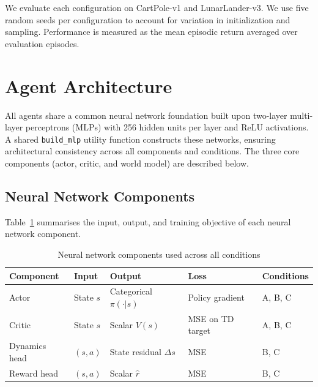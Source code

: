 We evaluate each configuration on CartPole-v1 and LunarLander-v3. We use five random seeds per configuration to account for variation in initialization and sampling. Performance is measured as the mean episodic return averaged over evaluation episodes.

\section{Agent Architecture}
\label{sec:method_arch}

All agents share a common neural network foundation built upon two-layer
multi-layer perceptrons (MLPs) with 256 hidden units per layer and ReLU
activations. A shared \texttt{build\_mlp} utility function constructs these
networks, ensuring architectural consistency across all components and conditions.
The three core components (actor, critic, and world model) are described below.

\subsection{Neural Network Components}
\label{subsec:method_nn}

Table~\ref{tab:nn_components} summarises the input, output, and training objective
of each neural network component.

\begin{table}[!ht]
    \centering
    \caption{Neural network components used across all conditions}
    \label{tab:nn_components}
    \begin{tabular}{lllll}
        \toprule
        \textbf{Component} & \textbf{Input} & \textbf{Output} & \textbf{Loss} & \textbf{Conditions} \\
        \midrule
        Actor   & State $s$ & Categorical $\pi(\cdot|s)$ & Policy gradient & A, B, C \\
        Critic  & State $s$ & Scalar $V(s)$              & MSE on TD target & A, B, C \\
        Dynamics head & $(s, a)$ & State residual $\Delta s$ & MSE & B, C \\
        Reward head   & $(s, a)$ & Scalar $\hat{r}$        & MSE & B, C \\
        \bottomrule
    \end{tabular}
\end{table}

